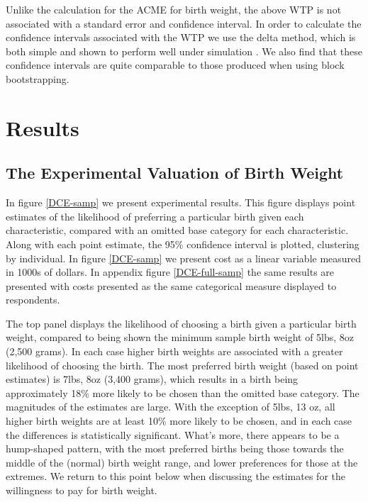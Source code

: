 \documentclass[a4paper, 11pt]{article}
\begin{document}
\begin{spacing}{1.4}
Unlike the calculation for the ACME for birth weight, the above WTP
is not associated with a standard error and confidence interval.  In
order to calculate the confidence intervals associated with the WTP
we use the delta method, which is both simple and shown to perform
well under simulation \citep{Hole2007}.  We also find that these
confidence intervals are quite comparable to those produced when using
block bootstrapping.

\section{Results}
\subsection{The Experimental Valuation of Birth Weight}
In figure \ref{DCE-samp} we present experimental results.  This figure
displays point estimates of the likelihood of preferring a particular
birth given each characteristic, compared with an omitted base category
for each characteristic.  Along with each point estimate, the 95\%
confidence interval is plotted, clustering by individual.  In figure
\ref{DCE-samp} we present cost as a linear variable measured in 1000s of
dollars.  In appendix figure \ref{DCE-full-samp} the same results are
presented with costs presented as the same categorical measure displayed
to respondents.

The top panel displays the likelihood of choosing a birth given a
particular birth weight, compared to being shown the minimum sample
birth weight of 5lbs, 8oz (2,500 grams).  In each case higher birth
weights are associated with a greater likelihood of choosing the
birth.  The most preferred birth weight (based on point estimates) is
7lbs, 8oz (3,400 grams), which results in a birth being approximately
18\% more likely to be chosen than the omitted base category.  The
magnitudes of the estimates are large.  With the exception of 5lbs, 13
oz, all higher birth weights are at least 10\% more likely to be chosen,
and in each case the differences is statistically significant.  What's
more, there appears to be a hump-shaped pattern, with the most
preferred births being those towards the middle of the (normal) birth
weight range, and lower preferences for those at the extremes.  We
return to this point below when discussing the estimates for the
willingness to pay for birth weight.


\end{spacing}
\end{document}

